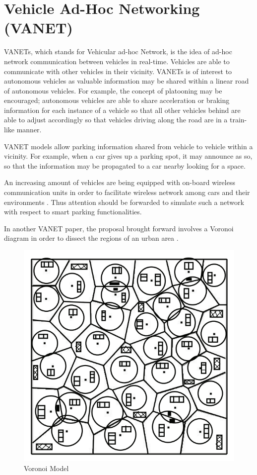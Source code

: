 \section{Vehicle Ad-Hoc Networking (VANET)}
VANETs, which stands for Vehicular ad-hoc Network, is the idea of ad-hoc network communication between vehicles in real-time. Vehicles are able to communicate with other vehicles in their vicinity. VANETs is of interest to autonomous vehicles as valuable information may be shared within a linear road of autonomous vehicles. For example, the concept of platooning may be encouraged; autonomous vehicles are able to share acceleration or braking information for each instance of a vehicle so that all other vehicles behind are able to adjust accordingly so that vehicles driving along the road are in a train-like manner.

VANET models allow parking information shared from vehicle to vehicle within a vicinity. For example, when a car gives up a parking spot, it may announce as so, so that the information may be propagated to a car nearby looking for a space.

An increasing amount of vehicles are being equipped with on-board wireless communication units in order to facilitate wireless network among cars and their environments \cite{10}. Thus attention should be forwarded to simulate such a network with respect to smart parking functionalities.

In another VANET paper, the proposal brought forward involves a Voronoi diagram in order to dissect the regions of an urban area \cite{11}. 

\begin{figure}[H]
    \centering
    \includegraphics[width=1\linewidth]{./Images/VORONOI.png}
    \caption{Voronoi Model}
    \label{fig:sub1}
\end{figure}


